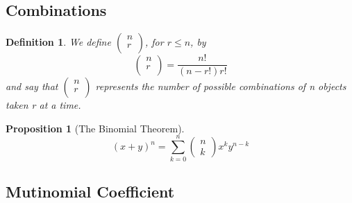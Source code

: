 \documentclass[12pt]{article}
\newtheorem{definition}{Definition}[subsection]
\newtheorem{proposition}{Proposition}[subsection]
\begin{document}
\subsection{Combinations}
    \begin{definition}
        We define $\left(\begin{array}{l}n\\r\\ \end{array}\right)$, for $r \leq n$, by
        \begin{equation}
            \left(\begin{array}{l}n\\r\\ \end{array}\right) = \frac{n!}{(n-r!) r!}
        \end{equation}
    and say that $\left(\begin{array}{l}n\\r\\ \end{array}\right)$ represents the number of possible combinations of n objects taken r at a time.
    \end{definition}
    \begin{proposition}[The Binomial Theorem]
        \begin{equation}
        (x+y)^n = \sum_{k=0}^n \left( \begin{array}{l} n\\ k \end{array}\right)x^ky^{n-k}
        \end{equation}
    \end{proposition}

    \subsection{Mutinomial Coefficient}
\end{document}
